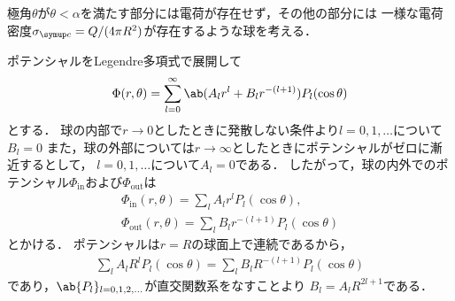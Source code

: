 極角$\theta$が$\theta < \alpha$を満たす部分には電荷が存在せず，その他の部分には
一様な電荷密度$\sigma_{\mr{c}} = Q /(4\pi R^2)$が存在するような球を考える．

  ポテンシャルをLegendre多項式で展開して
  \begin{gather}%
    \Phi(r,\theta) = \sum_{l=0}^\infty \ab(A_l r^l + B_l r^{-(l+1)}) P_l(\cos\theta)
  \end{gather}%
  とする．
  球の内部で$r\to 0$としたときに発散しない条件より$l = 0, 1, \ldots$について$B_l = 0$
  また，球の外部については$r \to \infty$としたときにポテンシャルがゼロに漸近するとして，
  $l = 0, 1, \ldots$について$A_l = 0$である．
  したがって，球の内外でのポテンシャル$\Phi_{\text{in}}$および$\Phi_{\text{out}}$は
  \begin{gather}%
    \Phi_{\text{in}}(r,\theta) = \sum_{l} A_l r^l P_l(\cos\theta),\\
    \Phi_{\text{out}}(r,\theta) = \sum_{l} B_l r^{-(l+1)} P_l(\cos\theta)
  \end{gather}%
  とかける．
  ポテンシャルは$r= R$の球面上で連続であるから，
  \begin{gather}%
    \sum_l A_l R^l P_l(\cos\theta) = \sum_l B_l R^{-(l+1)}P_l(\cos\theta)
  \end{gather}%
  であり，$\ab\{P_l\}_{l=0,1,2,\ldots}$が直交関数系をなすことより
  $B_l = A_l R^{2l+1}$である．


